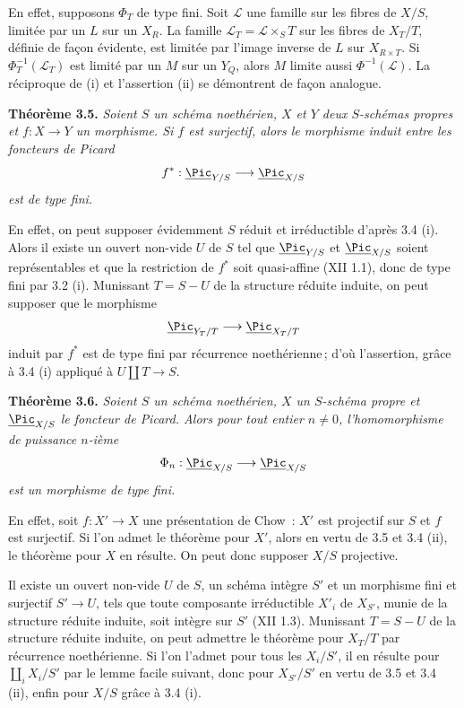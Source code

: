 En effet, supposons \(\Phi_T\) de type fini. Soit \(\mathscr L\) une famille sur les fibres de \(X/S\), limit\'ee par un \(L\) sur un \(X_R\). La famille \(\mathscr L_T=\mathscr L\times_S T\) sur les fibres de \(X_T/T\), d\'efinie de fa\c{c}on \'evidente, est limit\'ee par l'image inverse de \(L\) sur \(X_{R\times T}\). Si \(\Phi_T^{-1}(\mathscr L_T)\) est limit\'e par un \(M\) sur un \(Y_Q\), alors \(M\) limite aussi \(\Phi^{-1}(\mathscr L)\). La r\'eciproque de (i) et l'assertion (ii) se d\'emontrent de fa\c{c}on analogue.

\textbf{Th\'eor\`eme 3.5.} \emph{Soient \(S\) un sch\'ema noeth\'erien, \(X\) et \(Y\) deux \(S\)-sch\'emas propres et \(f:X\to Y\) un morphisme. Si \(f\) est surjectif, alors le morphisme induit entre les foncteurs de Picard}
\[
f^*:\underline{\Pic}_{Y/S}\longrightarrow\underline{\Pic}_{X/S}
\]
\emph{est de type fini.}

En effet, on peut supposer \'evidemment \(S\) r\'eduit et irr\'eductible d'apr\`es 3.4 (i). Alors il existe un ouvert non-vide \(U\) de \(S\) tel que \(\underline{\Pic}_{Y/S}\) et \(\underline{\Pic}_{X/S}\) soient repr\'esentables et que la restriction de \(f^*\) soit quasi-affine (XII 1.1), donc de type fini par 3.2 (i). Munissant \(T=S-U\) de la structure r\'eduite induite, on peut supposer que le morphisme
\[
\underline{\Pic}_{Y_T/T}\longrightarrow\underline{\Pic}_{X_T/T}
\]
induit par \(f^*\) est de type fini par r\'ecurrence noeth\'erienne\,; d'o\`u l'assertion, gr\^ace \`a 3.4 (i) appliqu\'e \`a \(U\amalg T\to S\).

\textbf{Th\'eor\`eme 3.6.} \emph{Soient \(S\) un sch\'ema noeth\'erien, \(X\) un \(S\)-sch\'ema propre et \(\underline{\Pic}_{X/S}\) le foncteur de Picard. Alors pour tout entier \(n\ne0\), l'homomorphisme de puissance \(n\)-i\`eme}
\[
\Phi_n:\underline{\Pic}_{X/S}\longrightarrow\underline{\Pic}_{X/S}
\]
\emph{est un morphisme de type fini.}

En effet, soit \(f:X'\to X\) une pr\'esentation de Chow~: \(X'\) est projectif sur \(S\) et \(f\) est surjectif. Si l'on admet le th\'eor\`eme pour \(X'\), alors en vertu de 3.5 et 3.4 (ii), le th\'eor\`eme pour \(X\) en r\'esulte. On peut donc supposer \(X/S\) projective.

Il existe un ouvert non-vide \(U\) de \(S\), un sch\'ema int\`egre \(S'\) et un morphisme fini et surjectif \(S'\to U\), tels que toute composante irr\'eductible \(X'_i\) de \(X_{S'}\), munie de la structure r\'eduite induite, soit int\`egre sur \(S'\) (XII 1.3). Munissant \(T=S-U\) de la structure r\'eduite induite, on peut admettre le th\'eor\`eme pour \(X_T/T\) par r\'ecurrence noeth\'erienne. Si l'on l'admet pour tous les \(X_i/S'\), il en r\'esulte pour \(\coprod_iX_i/S'\) par le
lemme facile suivant, donc pour \(X_{S'}/S'\) en vertu de 3.5 et 3.4 (ii), enfin pour \(X/S\) gr\^ace \`a 3.4 (i).

